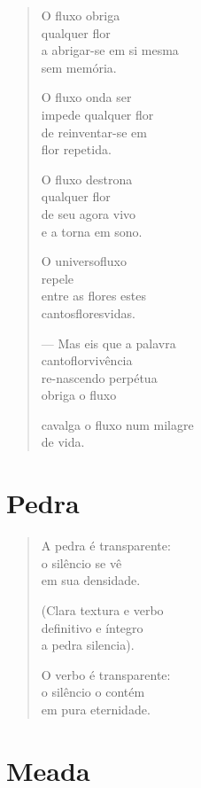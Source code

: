 \begin{verse}
O fluxo obriga\\
qualquer flor\\
a abrigar-se em si mesma\\
sem memória.

O fluxo onda ser\\
impede qualquer flor\\
de reinventar-se em\\
flor repetida.

O fluxo destrona\\
qualquer flor\\
de seu agora vivo\\
e a torna em sono.

O universofluxo\\
repele\\
entre as flores estes\\
cantosfloresvidas.

--- Mas eis que a palavra\\
cantoflorvivência\\
re-nascendo perpétua\\
obriga o fluxo

cavalga o fluxo num milagre\\
de vida.
\end{verse}

\chapter{Pedra}

\begin{verse}
A pedra é transparente:\\
o silêncio se vê\\
em sua densidade.

(Clara textura e verbo\\
definitivo e íntegro\\
a pedra silencia).

O verbo é transparente:\\
o silêncio o contém\\
em pura eternidade.
\end{verse}

\chapter{Meada}

